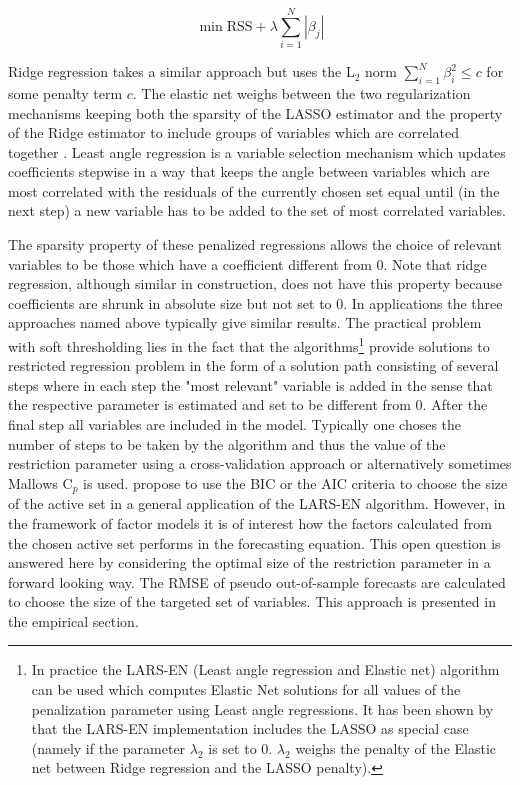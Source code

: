 \documentclass[12pt]{article}
\begin{document}
$$\min \text{RSS} + \lambda \sum_{i=1}^N |\beta_j|$$

Ridge regression takes a similar approach but uses the L$_2$ norm $\sum_{i=1}^N \beta_i^2 \leq c$ for some penalty term $c$. The elastic net weighs between the two regularization mechanisms keeping both the sparsity of the LASSO estimator and the property of the Ridge estimator to include groups of variables which are correlated together \citet{zou_hastie2005}. Least angle regression is a variable selection mechanism which updates coefficients stepwise in a way that keeps the angle between variables which are most correlated with the residuals of the currently chosen set equal until (in the next step) a new variable has to be added to the set of most correlated variables.

The sparsity property of these penalized regressions allows the choice of relevant variables to be those which have a coefficient different from $0$. Note that ridge regression, although similar in construction, does not have this property because coefficients are shrunk in absolute size but not set to $0$. In applications the three approaches named above typically give similar results.
The practical problem with soft thresholding lies in the fact that the algorithms\footnote{In practice the LARS-EN (Least angle regression and Elastic net) algorithm can be used which computes Elastic Net solutions for all values of the penalization parameter using Least angle regressions. It has been shown by \citet{efron_hastie_johnstone_tibshirani2004} that the LARS-EN implementation includes the LASSO as special case (namely if the parameter $\lambda_2$ is set to 0. $\lambda_2$ weighs the penalty of the Elastic net between Ridge regression and the LASSO penalty).} provide solutions to restricted regression problem in the form of a solution path consisting of several steps where in each step the "most relevant" variable is added in the sense that the respective parameter is estimated and set to be different from $0$. After the final step all variables are included in the model. Typically one choses the number of steps to be taken by the algorithm and thus the value of the restriction parameter using a cross-validation approach or alternatively sometimes Mallows C$_p$ is used. \citet{bai2008forecasting} propose to use the BIC or the AIC criteria to choose the size of the active set in a general application of the LARS-EN algorithm. However, in the framework of factor models it is of interest how the factors calculated from the chosen active set performs in the forecasting equation. This open question is answered here by considering the optimal size of the restriction parameter in a forward looking way. The RMSE of pseudo out-of-sample forecasts are calculated to choose the size of the targeted set of variables. This approach is presented in the empirical section. \\
\end{document}
